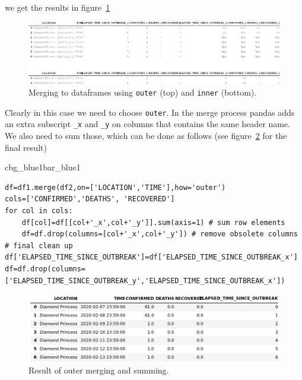 \documentclass[%
oneside,                 %
final,                   %
10pt]{article}
\newenvironment{_pro_tight}[2]{
   \def\FrameCommand{\color{#2}\vrule width 1mm\normalcolor\colorbox{#1}}
   \FrameRule0.6pt\MakeFramed {\advance\hsize-2mm\FrameRestore}\vskip3mm}
   {\vskip0mm\endMakeFramed}
\newenvironment{pro}[2]{
\bgroup\rmfamily
\fboxsep=0mm\relax
\begin{_pro_tight}{#1}{#2}
\list{}{\parsep=-2mm\parskip=0mm\topsep=0pt\leftmargin=2mm
\rightmargin=2\leftmargin\leftmargin=4pt\relax}
\item\relax}
{\endlist\end{_pro_tight}\egroup}
\begin{document}
we get the results in figure~\ref{fig:pd:merge} 

\begin{figure}[!ht]  %
  \centerline{\includegraphics[width=1.0\linewidth]{fig-pandas/merge.png}}
  \caption{
  Merging to dataframes using \texttt{outer} (top) and \texttt{inner} (bottom). \label{fig:pd:merge}
  }
\end{figure}

Clearly in this case we need to choose \texttt{outer}. In the merge process pandas adds an extra subscript \Verb!_x! and \Verb!_y! on columns that contains the same header name. We also need to sum those, which can be done as follows
(see figure~\ref{fig:pandas:merge3} for the final result)










\begin{pro}{cbg_blue1}{bar_blue1}\begin{Verbatim}[numbers=none,fontsize=\fontsize{9pt}{9pt},baselinestretch=0.95,xleftmargin=2mm]
df=df1.merge(df2,on=['LOCATION','TIME'],how='outer')
cols=['CONFIRMED','DEATHS', 'RECOVERED']
for col in cols:
    df[col]=df[[col+'_x',col+'_y']].sum(axis=1) # sum row elements
    df=df.drop(columns=[col+'_x',col+'_y']) # remove obsolete columns
# final clean up
df['ELAPSED_TIME_SINCE_OUTBREAK']=df['ELAPSED_TIME_SINCE_OUTBREAK_x']		
df=df.drop(columns=['ELAPSED_TIME_SINCE_OUTBREAK_y','ELAPSED_TIME_SINCE_OUTBREAK_x'])

\end{Verbatim}
\end{pro}
\noindent


\begin{figure}[!ht]  %
  \centerline{\includegraphics[width=1.0\linewidth]{fig-pandas/merge3.png}}
  \caption{
  Result of outer merging and summing. \label{fig:pandas:merge3}
  }
\end{figure}
\end{document}
